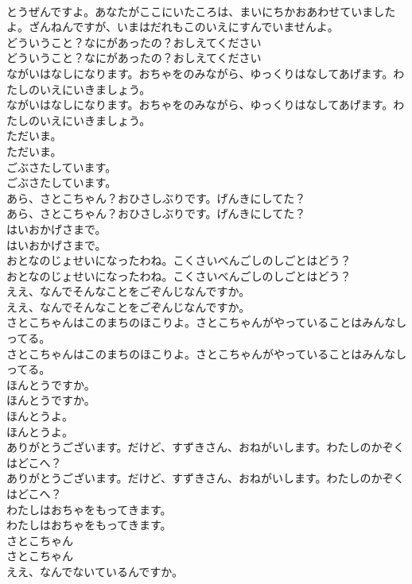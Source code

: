 \documentclass[8pt]{extreport}
\begin{document}
\begin{CJK}{UTF8}{min}
\\	とうぜんですよ。あなたがここにいたころは、まいにちかおあわせていましたよ。ざんねんですが、いまはだれもこのいえにすんでいませんよ。
\\	どういうこと？なにがあったの？おしえてください
\\	どういうこと？なにがあったの？おしえてください
\\	ながいはなしになります。おちゃをのみながら、ゆっくりはなしてあげます。わたしのいえにいきましょう。
\\	ながいはなしになります。おちゃをのみながら、ゆっくりはなしてあげます。わたしのいえにいきましょう。
\\	ただいま。
\\	ただいま。
\\	ごぶさたしています。
\\	ごぶさたしています。
\\	あら、さとこちゃん？おひさしぶりです。げんきにしてた？
\\	あら、さとこちゃん？おひさしぶりです。げんきにしてた？
\\	はいおかげさまで。
\\	はいおかげさまで。
\\	おとなのじょせいになったわね。こくさいべんごしのしごとはどう？
\\	おとなのじょせいになったわね。こくさいべんごしのしごとはどう？
\\	ええ、なんでそんなことをごぞんじなんですか。
\\	ええ、なんでそんなことをごぞんじなんですか。
\\	さとこちゃんはこのまちのほこりよ。さとこちゃんがやっていることはみんなしってる。
\\	さとこちゃんはこのまちのほこりよ。さとこちゃんがやっていることはみんなしってる。
\\	ほんとうですか。
\\	ほんとうですか。
\\	ほんとうよ。
\\	ほんとうよ。
\\	ありがとうございます。だけど、すずきさん、おねがいします。わたしのかぞくはどこへ？
\\	ありがとうございます。だけど、すずきさん、おねがいします。わたしのかぞくはどこへ？
\\	わたしはおちゃをもってきます。
\\	わたしはおちゃをもってきます。
\\	さとこちゃん
\\	さとこちゃん
\\	ええ、なんでないているんですか。

\end{CJK}
\end{document}
